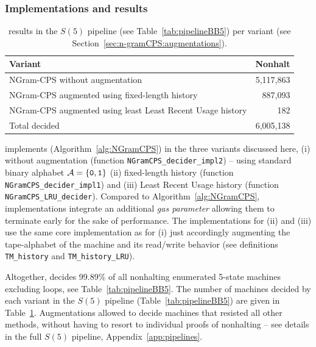 \subsubsection{Implementations and results}\label{sec:n-gramCPS:results}
\begin{table}[h!]
    \centering
    \begin{tabular}{|l|r|}
        \hline
        Variant                                                    & Nonhalt   \\  \hline
        NGram-CPS without augmentation                             & 5,117,863 \\
        NGram-CPS augmented using fixed-length history             & 887,093   \\
        NGram-CPS augmented using least Least Recent Usage history & 182       \\ \hline
        Total decided                                              & 6,005,138 \\
        \hline
    \end{tabular}
    \caption{\ngramcps results in the $S(5)$ pipeline (see Table~\ref{tab:pipelineBB5}) per variant (see Section~\ref{sec:n-gramCPS:augmentations}).}\label{tab:ngramcps:results}
\end{table}

\CoqBB implements \ngramcps (Algorithm~\ref{alg:NGramCPS}) in the three variants discussed here, (i) without augmentation (function \texttt{NGramCPS\_decider\_impl2}) -- \ie using standard binary alphabet $\mathcal{A}=\{\texttt{0},\texttt{1}\}$ (ii) fixed-length history (function \texttt{NGramCPS\_decider\_impl1}) and (iii) Least Recent Usage history (function \texttt{NGramCPS\_LRU\_decider}). Compared to Algorithm~\ref{alg:NGramCPS}, \CoqBB implementations integrate an additional \textit{gas parameter} allowing them to terminate early for the sake of performance. The implementations for (ii) and (iii) use the same core implementation as for (i) just accordingly augmenting the tape-alphabet of the machine and its read/write behavior (see definitions \texttt{TM\_history} and \texttt{TM\_history\_LRU}).

Altogether, \ngramcps decides 99.89\% of all nonhalting enumerated 5-state machines excluding loops, see Table~\ref{tab:pipelineBB5}. The number of machines decided by each \ngramcps variant in the $S(5)$ pipeline (Table~\ref{tab:pipelineBB5}) are given in Table~\ref{tab:ngramcps:results}. Augmentations allowed to decide machines that resisted all other methods, without having to resort to individual proofs of nonhalting -- see details in the full $S(5)$ pipeline, Appendix~\ref{app:pipelines}.

